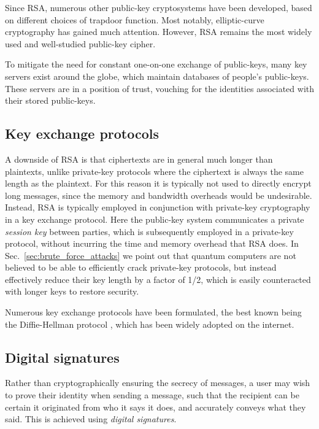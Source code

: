 Since RSA, numerous other public-key cryptosystems have been developed, based on different choices of trapdoor function. Most notably, elliptic-curve cryptography has gained much attention. However, RSA remains the most widely used and well-studied public-key cipher.

To mitigate the need for constant one-on-one exchange of public-keys, many key servers exist around the globe, which maintain databases of people's public-keys. These servers are in a position of trust, vouching for the identities associated with their stored public-keys.

%
%

\subsection{Key exchange protocols}

A downside of RSA is that ciphertexts are in general much longer than plaintexts, unlike private-key protocols where the ciphertext is always the same length as the plaintext. For this reason it is typically not used to directly encrypt long messages, since the memory and bandwidth overheads would be undesirable. Instead, RSA is typically employed in conjunction with private-key cryptography in a key exchange protocol. Here the public-key system communicates a private \textit{session key} between parties, which is subsequently employed in a private-key protocol, without incurring the time and memory overhead that RSA does. In Sec.~\ref{sec:brute_force_attacks} we point out that quantum computers are not believed to be able to efficiently crack private-key protocols, but instead effectively reduce their key length by a factor of 1/2, which is easily counteracted with longer keys to restore security.

Numerous key exchange protocols have been formulated, the best known being the Diffie-Hellman protocol \cite{DiffieHellman}, which has been widely adopted on the internet.

%
%

\subsection{Digital signatures} \label{sec:dig_sig} 

Rather than cryptographically ensuring the secrecy of messages, a user may wish to prove their identity when sending a message, such that the recipient can be certain it originated from who it says it does, and accurately conveys what they said. This is achieved using \textit{digital signatures}.

